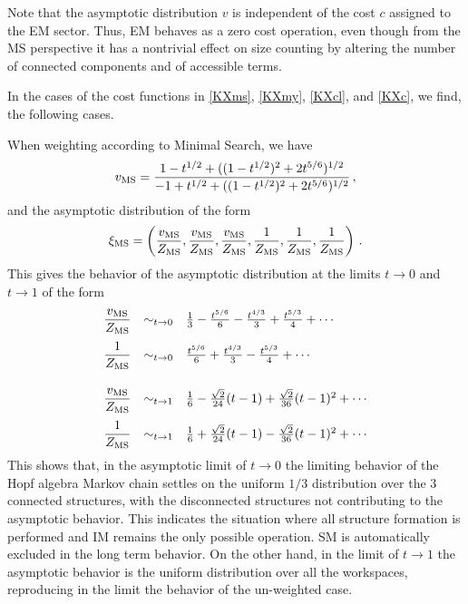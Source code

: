 \documentclass[12pt]{amsart}
\numberwithin{equation}{section}
\begin{document}
Note that the asymptotic distribution $v$ is independent of the cost $c$ assigned to the EM sector.
Thus, EM behaves as a zero cost operation, even though from the MS perspective it has a 
nontrivial effect on size counting by altering the number of connected components and of accessible terms. 

\smallskip

In the cases of the cost functions in \eqref{KXms}, \eqref{KXmy}, \eqref{KXcl}, and \eqref{KXc}, we find, the following cases.

When weighting according to Minimal Search, we have 
\begin{equation}\label{vms}
v_{{\rm MS}}= \frac{1-t^{1/2} + ((1-t^{1/2})^2 + 2 t^{5/6} )^{1/2}}{-1+t^{1/2}  + ((1-t^{1/2})^2 + 2 t^{5/6} )^{1/2}} \, ,
\end{equation}
and the asymptotic distribution of the form
$$ \xi_{{\rm MS}}= \left( \frac{v_{{\rm MS}}}{Z_{{\rm MS}}} , \frac{v_{{\rm MS}}}{Z_{{\rm MS}}} , \frac{v_{{\rm MS}}}{Z_{{\rm MS}}} ,
\frac{1}{Z_{{\rm MS}}} , \frac{1}{Z_{{\rm MS}}}, \frac{1}{Z_{{\rm MS}}} \right) \, . $$
This gives the behavior of the asymptotic distribution at the limits $t\to 0$ and $t \to 1$ of the form
\begin{equation}\label{xims}
\begin{array}{lcl}
\displaystyle{
 \frac{ v_{\rm MS} }{ Z_{\rm MS} } 
 } 
 & \sim_{t\to 0} &    \frac{1}{3} - \frac{t^{5/6}}{6} - \frac{t^{4/3}}{3}+ \frac{t^{5/3}}{4} + \cdots    \\[4mm]
\displaystyle{ 
 \frac{1}{ Z_{\rm MS} }  
} 
& \sim_{t\to 0} &       \frac{t^{5/6}}{6} + \frac{t^{4/3}}{3}-  \frac{t^{5/3}}{4} + \cdots                     \\[7mm]
\displaystyle{ 
\frac{ v_{\rm MS} }{ Z_{\rm MS} } 
} 
& \sim_{t\to 1} &   \frac{1}{6} - \frac{\sqrt{2}}{24} (t - 1) + \frac{\sqrt{2}}{36} (t - 1)^2  + \cdots      \\[4mm]
\displaystyle{ 
 \frac{1}{ Z_{\rm MS} } 
 } 
 & \sim_{t\to 1} & \frac{1}{6} + \frac{\sqrt{2}}{24} (t - 1) - \frac{\sqrt{2}}{36} (t - 1)^2  + \cdots 
\end{array}
\end{equation}
This shows that, in the asymptotic limit of $t\to 0$ the limiting behavior of the Hopf algebra Markov chain
settles on the uniform $1/3$ distribution
over the $3$ connected structures, with the disconnected structures not contributing to the asymptotic
behavior. This indicates the situation where all structure formation is performed and IM remains the only
possible operation. SM is automatically excluded in the long term behavior. On the other hand, in the
limit of $t\to 1$ the asymptotic behavior is the uniform distribution over all the workspaces, reproducing in
the limit the behavior of the un-weighted case. 
\end{document}
